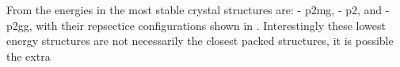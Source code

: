 From the energies in  the most stable crystal structures are: \sone{} - p2mg, \scon{} - p2, and \tri{} - p2gg, with their repsectice configurations shown in . Interestingly these lowest energy structures are not necessarily the closest packed structures, it is possible the extra 

\begin{figure}
    \centering
    \begin{subfigure}[t]{0.45\linewidth}
        \caption{}
        \label{fig:crystal sone}
    \end{subfigure}
    \begin{subfigure}[t]{0.45\linewidth}%
        \caption{}
        \label{fig:crystal scon}
    \end{subfigure}
    \begin{subfigure}{0.45\linewidth}
        \caption{}
        \label{fig:crystal tri}
    \end{subfigure}
    \caption{}
    \label{fig:crystals}
\end{figure}


